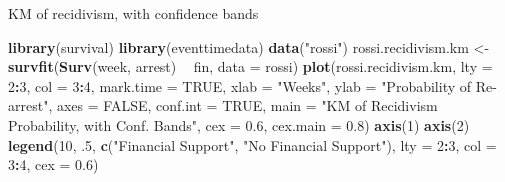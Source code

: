\documentclass[ignorenonframetext,]{beamer}
\newenvironment{Shaded}{\begin{snugshade}}{\end{snugshade}}
\newcommand{\DataTypeTok}[1]{\textcolor[rgb]{0.13,0.29,0.53}{#1}}
\newcommand{\DecValTok}[1]{\textcolor[rgb]{0.00,0.00,0.81}{#1}}
\newcommand{\FloatTok}[1]{\textcolor[rgb]{0.00,0.00,0.81}{#1}}
\newcommand{\KeywordTok}[1]{\textcolor[rgb]{0.13,0.29,0.53}{\textbf{#1}}}
\newcommand{\NormalTok}[1]{#1}
\newcommand{\OperatorTok}[1]{\textcolor[rgb]{0.81,0.36,0.00}{\textbf{#1}}}
\newcommand{\OtherTok}[1]{\textcolor[rgb]{0.56,0.35,0.01}{#1}}
\newcommand{\StringTok}[1]{\textcolor[rgb]{0.31,0.60,0.02}{#1}}
\begin{document}
\begin{frame}[fragile]{%
\protect\hypertarget{km-of-recidivism-with-confidence-bands}{%
KM of recidivism, with confidence bands}}

\footnotesize

\begin{Shaded}
\begin{Highlighting}[]
\KeywordTok{library}\NormalTok{(survival)}
\KeywordTok{library}\NormalTok{(eventtimedata)}
\KeywordTok{data}\NormalTok{(}\StringTok{"rossi"}\NormalTok{)}
\NormalTok{rossi.recidivism.km <-}\StringTok{ }\KeywordTok{survfit}\NormalTok{(}\KeywordTok{Surv}\NormalTok{(week, arrest) }\OperatorTok{~}\StringTok{ }\NormalTok{fin, }
                               \DataTypeTok{data =}\NormalTok{ rossi)}
\KeywordTok{plot}\NormalTok{(rossi.recidivism.km, }\DataTypeTok{lty =} \DecValTok{2}\OperatorTok{:}\DecValTok{3}\NormalTok{, }\DataTypeTok{col =} \DecValTok{3}\OperatorTok{:}\DecValTok{4}\NormalTok{, }\DataTypeTok{mark.time =} \OtherTok{TRUE}\NormalTok{, }
     \DataTypeTok{xlab =} \StringTok{"Weeks"}\NormalTok{, }
     \DataTypeTok{ylab =} \StringTok{"Probability of Re-arrest"}\NormalTok{, }
     \DataTypeTok{axes =} \OtherTok{FALSE}\NormalTok{, }
     \DataTypeTok{conf.int =} \OtherTok{TRUE}\NormalTok{,}
     \DataTypeTok{main =} \StringTok{"KM of Recidivism Probability, with Conf. Bands"}\NormalTok{,}
     \DataTypeTok{cex =} \FloatTok{0.6}\NormalTok{, }\DataTypeTok{cex.main =} \FloatTok{0.8}\NormalTok{)}
\KeywordTok{axis}\NormalTok{(}\DecValTok{1}\NormalTok{)}
\KeywordTok{axis}\NormalTok{(}\DecValTok{2}\NormalTok{)}
\KeywordTok{legend}\NormalTok{(}\DecValTok{10}\NormalTok{, }\FloatTok{.5}\NormalTok{, }\KeywordTok{c}\NormalTok{(}\StringTok{"Financial Support"}\NormalTok{, }\StringTok{"No Financial Support"}\NormalTok{),}
       \DataTypeTok{lty =} \DecValTok{2}\OperatorTok{:}\DecValTok{3}\NormalTok{, }\DataTypeTok{col =} \DecValTok{3}\OperatorTok{:}\DecValTok{4}\NormalTok{, }\DataTypeTok{cex =} \FloatTok{0.6}\NormalTok{)}
\end{Highlighting}
\end{Shaded}

\end{frame}
\end{document}

